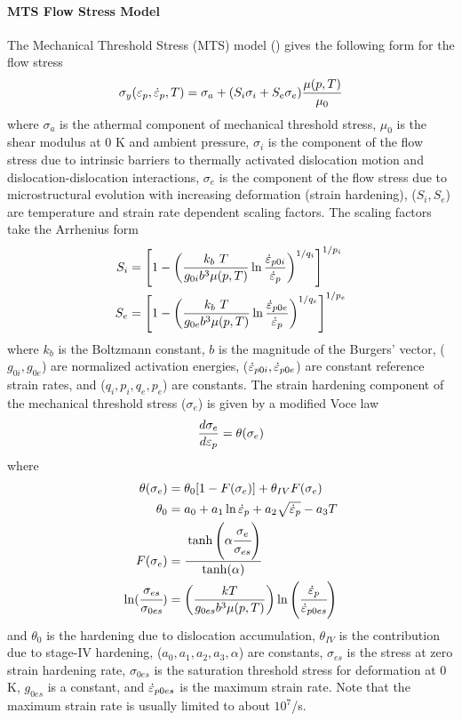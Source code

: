   \paragraph{MTS Flow Stress Model}
  The Mechanical Threshold Stress (MTS) model 
  (\cite{Follans1988,Goto2000a,Kocks2001})  
  gives the following form for the flow stress
  \begin{equation}
    \sigma_y(\varepsilon_p,\dot{\varepsilon}_{p},T) = 
      \sigma_a + (S_i \sigma_i + S_e \sigma_e)\frac{\mu(p,T)}{\mu_0} 
  \end{equation}
  where $\sigma_a$ is the athermal component of mechanical threshold stress,
  $\mu_0$ is the shear modulus at 0 K and ambient pressure, 
  $\sigma_i$ is the component of the flow stress due to intrinsic barriers 
  to thermally activated dislocation motion and dislocation-dislocation 
  interactions, $\sigma_e$ is the component of the flow stress due to 
  microstructural evolution with increasing deformation (strain hardening), 
  ($S_i, S_e$) are temperature and strain rate dependent scaling factors.  The
  scaling factors take the Arrhenius form
  \begin{align}
    S_i & = \left[1 - \left(\frac{k_b~T}{g_{0i}b^3\mu(p,T)}
    \ln\frac{\dot{\varepsilon}_{p0i}}{\dot{\varepsilon}_{p}}\right)^{1/q_i}
    \right]^{1/p_i} \\
    S_e & = \left[1 - \left(\frac{k_b~T}{g_{0e}b^3\mu(p,T)}
    \ln\frac{\dot{\varepsilon}_{p0e}}{\dot{\varepsilon}_{p}}\right)^{1/q_e}
    \right]^{1/p_e}
  \end{align}
  where $k_b$ is the Boltzmann constant, $b$ is the magnitude of the Burgers' 
  vector, ($g_{0i}, g_{0e}$) are normalized activation energies, 
  ($\dot{\varepsilon}_{p0i}, \dot{\varepsilon}_{p0e}$) are constant reference strain rates, and
  ($q_i, p_i, q_e, p_e$) are constants.  The strain hardening component
  of the mechanical threshold stress ($\sigma_e$) is given by a
  modified Voce law
  \begin{equation}\label{eq:MTSsige}
    \frac{d\sigma_e}{d\varepsilon_p} = \theta(\sigma_e)
  \end{equation}
  where
  \begin{align}
    \theta(\sigma_e) & = 
       \theta_0 [ 1 - F(\sigma_e)] + \theta_{IV} F(\sigma_e) \\
    \theta_0 & = a_0 + a_1 \ln \dot{\varepsilon}_{p} + a_2 \sqrt{\dot{\varepsilon}_{p}} - a_3 T \\
    F(\sigma_e) & = 
      \cfrac{\tanh\left(\alpha \cfrac{\sigma_e}{\sigma_{es}}\right)}
      {\tanh(\alpha)}\\
    \ln(\cfrac{\sigma_{es}}{\sigma_{0es}}) & =
    \left(\frac{kT}{g_{0es} b^3 \mu(p,T)}\right)
    \ln\left(\cfrac{\dot{\varepsilon}_{p}}{\dot{\varepsilon}_{p0es}}\right)
  \end{align}
  and $\theta_0$ is the hardening due to dislocation accumulation, 
  $\theta_{IV}$ is the contribution due to stage-IV hardening,
  ($a_0, a_1, a_2, a_3, \alpha$) are constants,
  $\sigma_{es}$ is the stress at zero strain hardening rate, 
  $\sigma_{0es}$ is the saturation threshold stress for deformation at 0 K,
  $g_{0es}$ is a constant, and $\dot{\varepsilon}_{p0es}$ is the maximum strain rate.  Note
  that the maximum strain rate is usually limited to about $10^7$/s.

